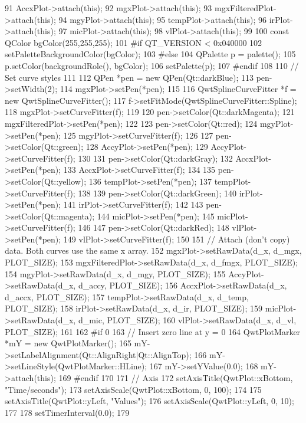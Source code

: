 \begin{DoxyCode}
{91     AccxPlot->attach(this);
92     mgxPlot->attach(this);
93     mgxFilteredPlot->attach(this);
94     mgyPlot->attach(this);
95     tempPlot->attach(this);
96     irPlot->attach(this);
97     micPlot->attach(this);
98     vlPlot->attach(this);
99 
100     const QColor bgColor(255,255,255);
101 #if QT_VERSION < 0x040000
102     setPaletteBackgroundColor(bgColor);
103 #else
104     QPalette p = palette();
105     p.setColor(backgroundRole(), bgColor);
106     setPalette(p);
107 #endif
108 
110     // Set curve styles
111 
112     QPen *pen = new QPen(Qt::darkBlue);
113     pen->setWidth(2);
114     mgxPlot->setPen(*pen);
115 
116     QwtSplineCurveFitter *f = new QwtSplineCurveFitter();
117     f->setFitMode(QwtSplineCurveFitter::Spline);
118     mgxPlot->setCurveFitter(f);
119 
120     pen->setColor(Qt::darkMagenta);
121     mgxFilteredPlot->setPen(*pen);
122 
123     pen->setColor(Qt::red);
124     mgyPlot->setPen(*pen);
125     mgyPlot->setCurveFitter(f);
126 
127     pen->setColor(Qt::green);
128     AccyPlot->setPen(*pen);
129     AccyPlot->setCurveFitter(f);
130 
131     pen->setColor(Qt::darkGray);
132     AccxPlot->setPen(*pen);
133     AccxPlot->setCurveFitter(f);
134 
135     pen->setColor(Qt::yellow);
136     tempPlot->setPen(*pen);
137     tempPlot->setCurveFitter(f);
138 
139     pen->setColor(Qt::darkGreen);
140     irPlot->setPen(*pen);
141     irPlot->setCurveFitter(f);
142 
143     pen->setColor(Qt::magenta);
144     micPlot->setPen(*pen);
145     micPlot->setCurveFitter(f);
146 
147     pen->setColor(Qt::darkRed);
148     vlPlot->setPen(*pen);
149     vlPlot->setCurveFitter(f);
150 
151     // Attach (don't copy) data. Both curves use the same x array.
152     mgxPlot->setRawData(d_x, d_mgx, PLOT_SIZE);
153     mgxFilteredPlot->setRawData(d_x, d_fmgx, PLOT_SIZE);
154     mgyPlot->setRawData(d_x, d_mgy, PLOT_SIZE);
155     AccyPlot->setRawData(d_x, d_accy, PLOT_SIZE);
156     AccxPlot->setRawData(d_x, d_accx, PLOT_SIZE);
157     tempPlot->setRawData(d_x, d_temp, PLOT_SIZE);
158     irPlot->setRawData(d_x, d_ir, PLOT_SIZE);
159     micPlot->setRawData(d_x, d_mic, PLOT_SIZE);
160     vlPlot->setRawData(d_x, d_vl, PLOT_SIZE);
161 
162 #if 0
163     //  Insert zero line at y = 0
164     QwtPlotMarker *mY = new QwtPlotMarker();
165     mY->setLabelAlignment(Qt::AlignRight|Qt::AlignTop);
166     mY->setLineStyle(QwtPlotMarker::HLine);
167     mY->setYValue(0.0);
168     mY->attach(this);
169 #endif
170 
171     // Axis 
172     setAxisTitle(QwtPlot::xBottom, "Time/seconds");
173     setAxisScale(QwtPlot::xBottom, 0, 100);
174 
175     setAxisTitle(QwtPlot::yLeft, "Values");
176     setAxisScale(QwtPlot::yLeft, 0, 10);
177     
178     setTimerInterval(0.0); 
179 }
\end{DoxyCode}




